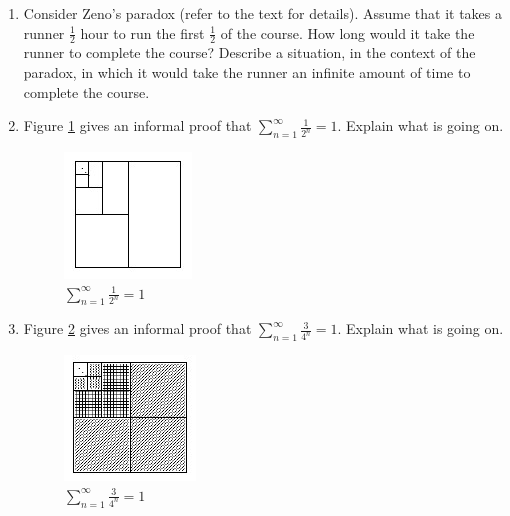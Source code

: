 \begin{enumerate}
\item Consider Zeno's paradox (refer to the text for details).  Assume that it takes a runner $\frac{1}{2}$ hour to run the first $\frac{1}{2}$
 of the course.  How long would it take the runner to complete the course?  Describe a situation, in the context of the paradox, in which it would take the runner an infinite amount of time to complete the course.

\item Figure \ref{GeoSeries1} gives an informal proof that $
\displaystyle\sum\limits_{n = 1}^\infty  {\frac{1}{{2^n }}}  = 1$.  Explain what is going on.

\begin{figure}[ht]
	\centering
		\includegraphics{TeXGraphics/GeoSeries1.jpg}
	\caption{$\displaystyle\sum\limits_{n = 1}^\infty  {\frac{1}{{2^n }}}  = 1$}
	\label{GeoSeries1}
\end{figure}

\item Figure \ref{GeoSeries2} gives an informal proof that $\displaystyle\sum\limits_{n = 1}^\infty  {\frac{3}{{4^n }}}  = 1$.  Explain what is going on. %
\begin{figure}[ht]
	\centering
		\includegraphics{TeXGraphics/GeoSeries2.jpg}
	\caption{$\displaystyle\sum\limits_{n = 1}^\infty  {\frac{3}{{4^n }}}  = 1$}
	\label{GeoSeries2}
\end{figure}

\end{enumerate}
